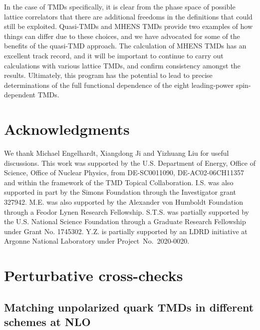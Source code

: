 \documentclass[11pt,a4paper]{article}
\begin{document}
In the case of TMDs specifically, it is clear from the phase space of possible lattice correlators that there are additional freedoms in the definitions that could still be exploited. Quasi-TMDs and MHENS TMDs provide two examples of how things can differ due to these choices, and we have advocated for some of the benefits of the quasi-TMD approach. The calculation of MHENS TMDs has an excellent track record, and it will be important to continue to carry out calculations with various lattice TMDs, and confirm consistency amongst the results. Ultimately, this program has the potential to lead to precise determinations of the full functional dependence of the eight leading-power spin-dependent TMDs.

\section*{Acknowledgments}

We thank Michael Engelhardt, Xiangdong Ji and Yizhuang Liu for useful discussions. This work was supported by the U.S. Department of Energy, Office of Science, Office of Nuclear Physics, from DE-SC0011090, DE-AC02-06CH11357 and within the framework of the TMD Topical Collaboration. I.S. was also supported in part by the Simons Foundation through the Investigator grant 327942. M.E. was also supported by the Alexander von Humboldt Foundation through a Feodor Lynen Research Fellowship. S.T.S. was partially supported by the U.S. National Science Foundation through a Graduate Research Fellowship under Grant No. 1745302. Y.Z. is partially supported by an LDRD initiative at Argonne National Laboratory under Project~No.~2020-0020.

\appendix

\section{Perturbative cross-checks}
\label{app:check}

\subsection{Matching unpolarized quark TMDs in different schemes at NLO}
\label{app:jmy}
\end{document}
